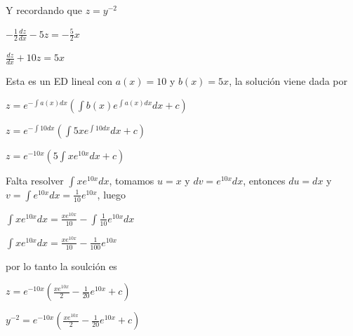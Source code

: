 \documentclass{article}
\theoremstyle{plain}
\theoremstyle{definition}
\begin{document}
Y recordando que $z=y^{-2}$



\begin{center}
$\displaystyle -\frac{1}{2}\frac{dz}{dx}-5z = -\frac{5}{2} x$
\end{center}


\begin{center}
$\displaystyle \frac{dz}{dx}+ 10z =  5x$
\end{center}


Esta es un ED lineal con $a(x)=10$ y $b(x)=5x$, la solución viene dada por




\begin{center}
$\displaystyle z =  e^{-\int a(x)dx} \left( \int b(x)e^{\int a(x)dx} dx  +c\right) $
\end{center}



\begin{center}
$\displaystyle z =  e^{-\int 10 dx} \left( \int 5xe^{\int 10dx} dx  +c\right) $
\end{center}



\begin{center}
$\displaystyle z =  e^{-10x} \left( 5\int xe^{10x} dx  +c\right) $
\end{center}

Falta resolver  $\displaystyle \int xe^{10x} dx$, tomamos $u=x$ y $dv=e^{10x}dx$, entonces $du=dx$ y $v= \displaystyle \int e^{10x}dx = \frac{1}{10} e^{10x}$, luego


\begin{center}
$\displaystyle \int xe^{10x} dx = \frac{xe^{10x}}{10} - \int \frac{1}{10}e^{10x}dx$
\end{center}


\begin{center}
$\displaystyle \int xe^{10x} dx = \frac{xe^{10x}}{10} - \frac{1}{100}e^{10x}$
\end{center}

por lo tanto la soulción es

\begin{center}
$\displaystyle z =  e^{-10x} \left( \frac{xe^{10x}}{2} - \frac{1}{20}e^{10x}   +c\right) $
\end{center}



\newpage

\begin{center}
$\displaystyle y^{-2} =  e^{-10x} \left( \frac{xe^{10x}}{2} - \frac{1}{20}e^{10x} +c\right) $
\end{center}
\end{document}
